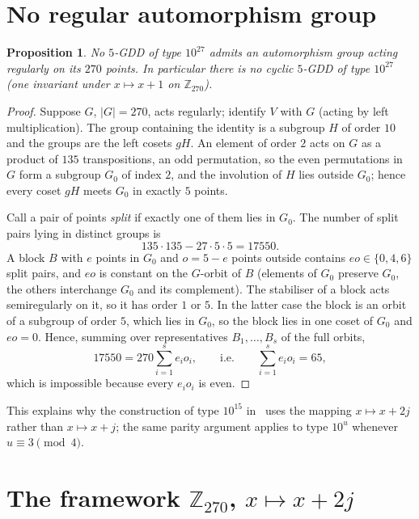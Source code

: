\documentclass[11pt]{article}
\newtheorem{proposition}[theorem]{Proposition}
\theoremstyle{remark}
\newcommand{\Z}{\mathbb{Z}}
\begin{document}
\section{No regular automorphism group}\label{sec:regular}

\begin{proposition}\label{prop:regular}
No $5$-GDD of type $10^{27}$ admits an automorphism group acting regularly on its $270$ points.
In particular there is no cyclic $5$-GDD of type $10^{27}$ (one invariant under $x\mapsto x+1$ on $\Z_{270}$).
\end{proposition}

\begin{proof}
Suppose $G$, $|G|=270$, acts regularly; identify $V$ with $G$ (acting by left multiplication).
The group containing the identity is a subgroup $H$ of order $10$ and the groups are the left
cosets $gH$.  An element of order $2$ acts on $G$ as a product of $135$ transpositions, an odd
permutation, so the even permutations in $G$ form a subgroup $G_0$ of index $2$, and the
involution of $H$ lies outside $G_0$; hence every coset $gH$ meets $G_0$ in exactly $5$ points.

Call a pair of points \emph{split} if exactly one of them lies in $G_0$.  The number of split
pairs lying in distinct groups is
\[
135\cdot 135-27\cdot 5\cdot 5=17550 .
\]
A block $B$ with $e$ points in $G_0$ and $o=5-e$ points outside contains $eo\in\{0,4,6\}$ split
pairs, and $eo$ is constant on the $G$-orbit of $B$ (elements of $G_0$ preserve $G_0$, the others
interchange $G_0$ and its complement).  The stabiliser of a block acts semiregularly on it, so it
has order $1$ or $5$.  In the latter case the block is an orbit of a subgroup of order $5$, which
lies in $G_0$, so the block lies in one coset of $G_0$ and $eo=0$.  Hence, summing over
representatives $B_1,\dots,B_s$ of the full orbits,
\[
17550=270\sum_{i=1}^{s} e_io_i ,\qquad\text{i.e.}\qquad \sum_{i=1}^{s}e_io_i=65,
\]
which is impossible because every $e_io_i$ is even.
\end{proof}

This explains why the construction of type $10^{15}$ in~\cite{Forbes2023} uses the mapping
$x\mapsto x+2j$ rather than $x\mapsto x+j$; the same parity argument applies to
type $10^{u}$ whenever $u\equiv 3\pmod 4$.

\section{\texorpdfstring{The framework $\Z_{270}$, $x\mapsto x+2j$}{The framework Z270, x -> x+2j}}\label{sec:framework}
\end{document}

